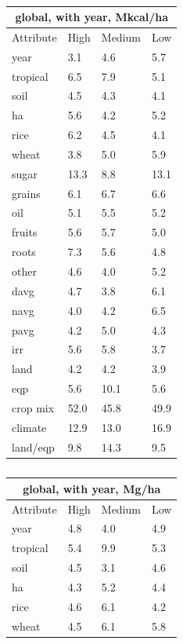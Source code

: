 \documentclass[12pt]{article}
\begin{document}
\begin{table}[h!]
\parbox{.45\linewidth} {
\centering
\begin{tabular}{llll}
\toprule
\multicolumn{4}{c}{\textbf{global, with year, Mkcal/ha}} \\
\midrule
Attribute & High & Medium & Low \\
\midrule
year & 3.1 & 4.6 & 5.7 \\
tropical & 6.5 & 7.9 & 5.1 \\
soil & 4.5 & 4.3 & 4.1 \\
ha & 5.6 & 4.2 & 5.2 \\
rice & 6.2 & 4.5 & 4.1 \\
wheat & 3.8 & 5.0 & 5.9 \\
sugar & 13.3 & 8.8 & 13.1 \\
grains & 6.1 & 6.7 & 6.6 \\
oil & 5.1 & 5.5 & 5.2 \\
fruits & 5.6 & 5.7 & 5.0 \\
roots & 7.3 & 5.6 & 4.8 \\
other & 4.6 & 4.0 & 5.2 \\
davg & 4.7 & 3.8 & 6.1 \\
navg & 4.0 & 4.2 & 6.5 \\
pavg & 4.2 & 5.0 & 4.3 \\
irr & 5.6 & 5.8 & 3.7 \\
land & 4.2 & 4.2 & 3.9 \\
eqp & 5.6 & 10.1 & 5.6 \\
\midrule
crop mix & 52.0 & 45.8 & 49.9 \\
climate & 12.9 & 13.0 & 16.9 \\
land/eqp & 9.8 & 14.3 & 9.5 \\
\bottomrule
\end{tabular}
\caption{ }
\label{k.wy.wt_percentages}
}
\parbox{.45\linewidth} {
\centering
\begin{tabular}{llll}
\toprule
\multicolumn{4}{c}{\textbf{global, with year, Mg/ha}} \\
\midrule
Attribute & High & Medium & Low \\
\midrule
year & 4.8 & 4.0 & 4.9 \\
tropical & 5.4 & 9.9 & 5.3 \\
soil & 4.5 & 3.1 & 4.6 \\
ha & 4.3 & 5.2 & 4.4 \\
rice & 4.6 & 6.1 & 4.2 \\
wheat & 4.5 & 6.1 & 5.8 \\

\end{tabular}}
\end{table}
\end{document}
